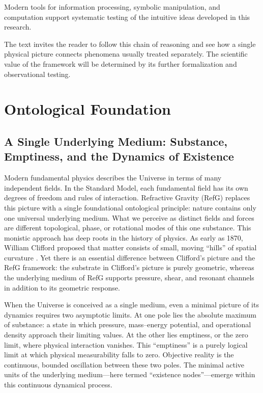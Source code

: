 \documentclass[11pt,a4paper]{article}
\begin{document}
Modern tools for information processing, symbolic manipulation, and computation support systematic testing of the intuitive ideas developed in this research.

The text invites the reader to follow this chain of reasoning and see how a single physical picture connects phenomena usually treated separately. The scientific value of the framework will be determined by its further formalization and observational testing.

\section{Ontological Foundation}

\subsection{A Single Underlying Medium: Substance, Emptiness, and the Dynamics of Existence}

Modern fundamental physics describes the Universe in terms of many independent fields. In the Standard Model, each fundamental field has its own degrees of freedom and rules of interaction. Refractive Gravity (RefG) replaces this picture with a single foundational ontological principle: nature contains only one universal underlying medium. What we perceive as distinct fields and forces are different topological, phase, or rotational modes of this one substance. This monistic approach has deep roots in the history of physics. As early as 1870, William Clifford proposed that matter consists of small, moving ``hills'' of spatial curvature \citep{clifford1876}. Yet there is an essential difference between Clifford's picture and the RefG framework: the substrate in Clifford's picture is purely geometric, whereas the underlying medium of RefG supports pressure, shear, and resonant channels in addition to its geometric response.

When the Universe is conceived as a single medium, even a minimal picture of its dynamics requires two asymptotic limits. At one pole lies the absolute maximum of substance: a state in which pressure, mass--energy potential, and operational density approach their limiting values. At the other lies emptiness, or the zero limit, where physical interaction vanishes. This ``emptiness'' is a purely logical limit at which physical measurability falls to zero. Objective reality is the continuous, bounded oscillation between these two poles. The minimal active units of the underlying medium---here termed ``existence nodes''---emerge within this continuous dynamical process.
\end{document}
